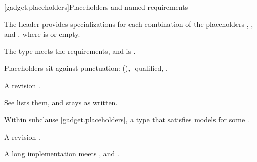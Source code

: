 [gadget.placeholders]{Placeholders and named requirements}

\pnum
The header provides specializations for each combination of the placeholders \cv{}, , and , where \cv{} is  or empty.

\pnum
The type  meets the  requirements, and  is \cv{}\tcode{\&}.

\pnum
Placeholders sit against punctuation: (), -qualified, .

\pnum
A revision .

\pnum
See  lists them, and  stays as written.

\pnum
Within subclause \ref{gadget.placeholders}, a type that satisfies  models  for some  .

\pnum
A revision .

\pnum
A long imple\-mentation meets ,  and \linebreak {}.
